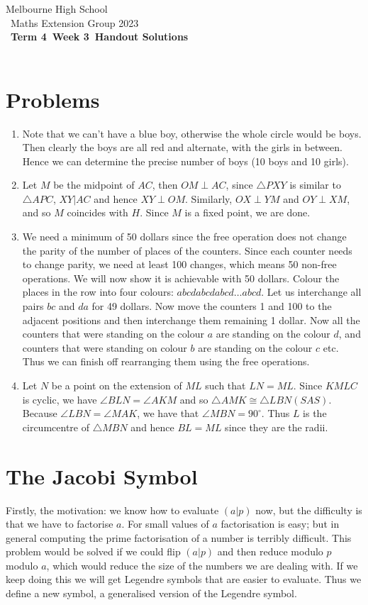 \documentclass[a4paper]{article}
\title{{\thepdftitle}}
\author{Nathan Wong\and Tom Yan}
\date{2023}
\newcommand{\theterm}{4}
\newcommand{\theweek}{3}
\newcommand{\thedisplaytitle}{Term \theterm\ Week \theweek\ Handout Solutions}
\newcommand{\ileg}[2]{(#1|#2)}
\begin{document}
\noindent Melbourne High School\\\
\noindent Maths Extension Group 2023\\\
\noindent \textbf{\thedisplaytitle}\\\
\section*{Problems}
\begin{enumerate}
\item  Note that we can't have a blue boy, otherwise the whole circle would be boys. Then clearly the boys are all red and alternate, with the girls in between. Hence we can determine the precise number of boys (10 boys and 10 girls).
\item  Let $M$ be the midpoint of $AC$, then $OM \perp AC$, since $\triangle PXY$ is similar to $\triangle APC$, $XY | AC$ and hence $XY \perp OM$. Similarly, $OX \perp YM$ and $OY \perp XM$, and so $M$ coincides with $H$. Since $M$ is a fixed point, we are done.
\item  We need a minimum of 50 dollars since the free operation does not change the parity of the number of places of the counters. Since each counter needs to change parity, we need at least 100 changes, which means 50 non-free operations. We will now show it is achievable with 50 dollars. Colour the places in the row into four colours: $abcdabcdabcd\ldots abcd$. Let us interchange all pairs $bc$ and $da$ for 49 dollars. Now move the counters 1 and 100 to the adjacent positions and then interchange them remaining 1 dollar. Now all the counters that were standing on the colour $a$ are standing on the colour $d$, and counters that were standing on colour $b$ are standing on the colour $c$ etc. Thus we can finish off rearranging them using the free operations.
\item  Let $N$ be a point on the extension of $ML$ such that $LN=ML$. Since $KMLC$ is cyclic, we have $\angle BLN = \angle AKM$ and so $\triangle AMK \cong \triangle LBN (SAS)$. Because $\angle LBN = \angle MAK$, we have that $\angle MBN = 90^{\circ}$. Thus $L$ is the circumcentre of $\triangle MBN$ and hence $BL = ML$ since they are the radii.
\end{enumerate}
\pagebreak
\section*{The Jacobi Symbol}
Firstly, the motivation: we know how to evaluate
\(\ileg{a}{p}\) now, but the difficulty is that
we have to factorise \(a\). For small values of \(a\)
factorisation is easy; but in general computing
the prime factorisation of a number is terribly difficult.
This problem would be solved if we could flip \(\ileg{a}{p}\)
and then reduce modulo \(p\) modulo \(a\), which would reduce
the size of the numbers we are dealing with. 
If we keep doing this we will get Legendre symbols that are
easier to evaluate.
Thus we define a new symbol, a generalised version of
the Legendre symbol.
\end{document}
